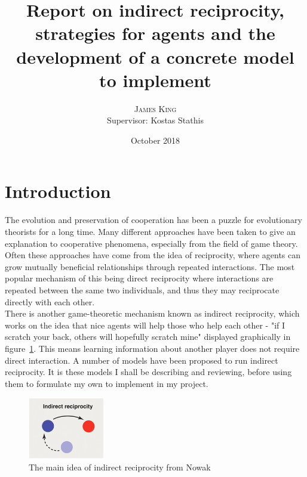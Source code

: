\documentclass[twoside,twocolumn]{article}
\title{ Report on indirect reciprocity, strategies for agents and the development of a concrete model to implement} %
\author{%
\textsc{James King} \\%
\normalsize Supervisor: Kostas Stathis \\ %
}
\date{October 2018} %
\begin{document}



\maketitle


\section{Introduction}
The evolution and preservation of cooperation has been a puzzle for evolutionary theorists for a long time. Many different approaches have been taken to give an explanation to cooperative phenomena, especially from the field of game theory. Often these approaches have come from the idea of reciprocity, where agents can grow mutually beneficial relationships through repeated interactions. The most popular mechanism of this being direct reciprocity where interactions are repeated between the same two individuals, and thus they may reciprocate directly with each other.\\
There is another game-theoretic mechanism known as indirect reciprocity, which works on the idea that nice agents will help those who help each other - "if I scratch your back, others will hopefully scratch mine" displayed graphically in figure~\ref{fig:indir_rec}. This means learning information about another player does not require direct interaction. A number of models have been proposed to run indirect reciprocity. It is these models I shall be describing and reviewing, before using them to formulate my own to implement in my project.
\begin{figure}
	\begin{center}
	\includegraphics[width=0.3\textwidth]{Indirect_rec.png}
	\caption{The main idea of indirect reciprocity from Nowak~\cite{five_rules_coop}}
	\label{fig:indir_rec}
	\end{center}
\end{figure}
\end{document}
